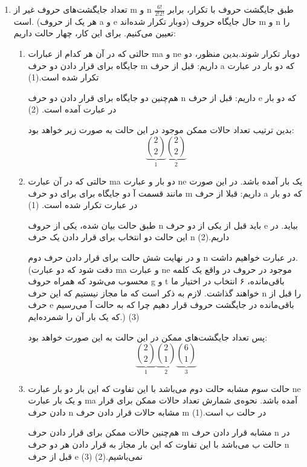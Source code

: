   \begin{enumerate}
    \item 
    تعداد جایگشت‌های حروف غیر از m و n طبق جایگشت حروف با تکرار، برابر $\frac{6!}{2!2!}$ است.
    (هر یک از حروف a و e دوبار تکرار شده‌اند)
    حال جایگاه حروف m و n را تعیین می‌کنیم.
    برای این کار، چهار حالت داریم:
    \begin{enumerate}
      \item 
      حالتی که در آن هر کدام از عبارات ma و ne
      دوبار تکرار شوند.بدین منظور، دو جایگاه برای قرار دادن دو حرف m داریم:
      قبل از حرف  a که دو بار در عبارت تکرار شده است.(1)
      
      هم‌چنین دو جایگاه برای قرار دادن دو حرف n داریم:
      قبل از حرف e که دو بار در عبارت آمده است.
      (2)
      
      بدین ترتیب تعداد حالات ممکن موجود در این حالت به صورت زیر خواهد بود:
      $$\underbrace{{2 \choose 2}}_{1}\underbrace{{2 \choose 2}}_{2}$$
      \item
      حالتی که در آن عبارت ma دو بار و عبارت ne یک بار آمده باشد. در این صورت مانند قسمت آ دو جایگاه برای 
      برای دو حرف m داریم:
      قبلا از حرف a که دو بار در عبارت تکرار شده است.
      (1)
      
      طبق حالت بیان شده، یکی از حروف n باید قبل از یکی از دو حرف e
      بیاید. در این حالت دو انتخاب برای قرار دادن یک حرف n داریم.(2)
      
      و در نهایت شش حالت برای قرار دادن حرف دوم n در عبارت خواهیم داشت.
      (دقت شود که دو عبارت ma و عبارت ne موجود در حروف
      در واقع یک کلمه محسوب می‌شود که همراه حروف  g و t باقی‌مانده، ۶ انتخاب در اختیار ما خواهند گذاشت.
      لازم به ذکر است که ما مجاز نیستیم که این حرف n را قبل از حرف e باقی‌مانده در جایگشت حروف قرار دهیم چرا که به حالت آ می‌رسیم که یک بار آن را شمرده‌ایم.)
      (3)
      
      پس تعداد جایگشت‌های ممکن در این حالت به این صورت خواهد بود:
      $$\underbrace{{2\choose 2}}_{1}\underbrace{{2 \choose 1}}_{2}\underbrace{{6\choose 1}}_{3}$$
      \item
      حالت سوم مشابه حالت دوم می‌باشد با این تفاوت که این بار دو بار 
      عبارت ne و یک بار عبارت ma آمده باشد.
      نحوه‌ی شمارش تعداد حالات ممکن برای قرار دادن حرف n مشابه حالات قرار دادن حرف m در حالت ب است.(1)
      
      هم‌چنین حالات ممکن برای قرار دادن حرف m مشابه قرار دادن حرف n در حالت ب می‌باشد با این تفاوت که این بار مجاز به قرار دادن هر دو حرف n قبل از حرف e نمی‌باشیم.(2) (3)
      

\end{enumerate}
\end{enumerate}
